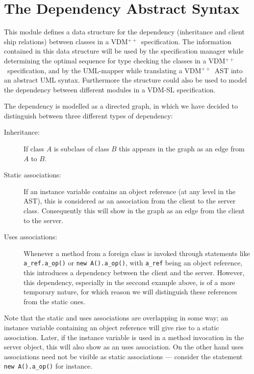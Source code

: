 \documentclass[a4paper,dvips]{article}
\newcommand{\vpp}{VDM$^{++}$}
\begin{document}
\section{The Dependency Abstract Syntax} 

This module defines a data structure for the dependency (inheritance
and client ship relations) between classes in a \vpp\ specification.
The information contained in this data structure will be used by the
specification manager while determining the optimal sequence for type
checking the classes in a \vpp\ specification, and by the UML-mapper
while translating a \vpp\ AST into an abstract UML syntax. Furthermore
the structure could also be used to model the dependency between
different modules in a VDM-SL specification.

The dependency is modelled as a directed graph, in which we have
decided to distinguish between three different types of dependency:
\begin{description}
\item[Inheritance:] If class $A$ is subclass of class $B$ this appears
  in the graph as an edge from $A$ to $B$.
\item[Static associations:] If an  instance variable contains an object
  reference (at any level in the AST), this is considered as an
  association from the client to the server class. Consequently this
  will show in the graph as an edge from the client to the server.
\item[Uses associations:] Whenever a method from a foreign class is
  invoked through statements like \verb+a_ref.a_op()+ or
  \verb+new A().a_op()+, with \verb+a_ref+ being an object reference,
  this introduces a dependency between the client and the
  server. However, this dependency, especially in the seccond example
  above, is of a more temporary nature, for which reason we will
  distinguish these references from the static ones. 
\end{description}
Note that the static and uses associations are overlapping in some
way; an instance variable containing an object reference will give
rise to a static association. Later, if the instance variable is used
in a method invocation in the server object, this will also show as an
uses association. On the other hand uses associations need not be
visible as static associations --- consider the statement
\verb+new A().a_op()+ for instance.


\end{document}
